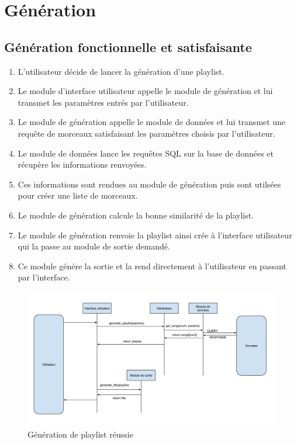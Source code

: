 \section{Génération}
\label{scenarii:gen}

\subsection{Génération fonctionnelle et satisfaisante}
\label{scenarii:gen:satis}

\begin{enumerate}
\item L'utilisateur décide de lancer la génération d'une playlist.
\item Le module d'interface utilisateur appelle le module de génération et 
lui transmet les paramètres entrés par l'utilisateur.
\item Le module de génération appelle le module de données et lui transmet 
une requête de morceaux satisfaisant les paramètres choisis par l'utilisateur.
\item Le module de données lance les requêtes SQL sur la base de données et
récupère les informations renvoyées.
\item Ces informations sont rendues au module de génération puis sont 
utilsées pour créer une liste de morceaux.
\item Le module de génération calcule la bonne similarité de la playlist.
\item Le module de génération renvoie la playlist ainsi crée à l'interface 
utilisateur qui la passe au module de sortie demandé.
\item Ce module génére la sortie et la rend directement à l'utilisateur en 
passant par l'interface.
\end{enumerate}

\begin{figure}[H]
\includegraphics[width=\textwidth]{data/scenarii/generation_fonctionnel.png}
\caption{Génération de playlist réussie}
\end{figure}


